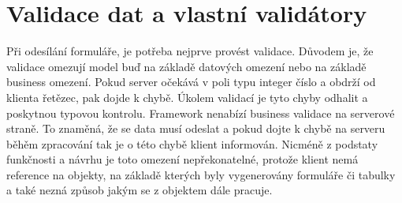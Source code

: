 \section{Validace dat a vlastní validátory}
Při odesílání formuláře, je potřeba nejprve provést validace. Důvodem je, že validace omezují model buď na základě datových omezení nebo na základě business omezení. Pokud server očekává v poli typu integer číslo a obdrží od klienta řetězec, pak dojde k chybě. Úkolem validací je tyto chyby odhalit a poskytnou typovou kontrolu. Framework nenabízí business validace na serverové straně. To znaměná, že se data musí odeslat a pokud dojte k chybě na serveru běhěm zpracování tak je o této chybě klient informován. Nicméně z podstaty funkčnosti a návrhu je toto omezení nepřekonatelné, protože klient nemá reference na objekty, na základě kterých byly vygenerovány formuláře či tabulky a také nezná způsob jakým se z objektem dále pracuje. 
